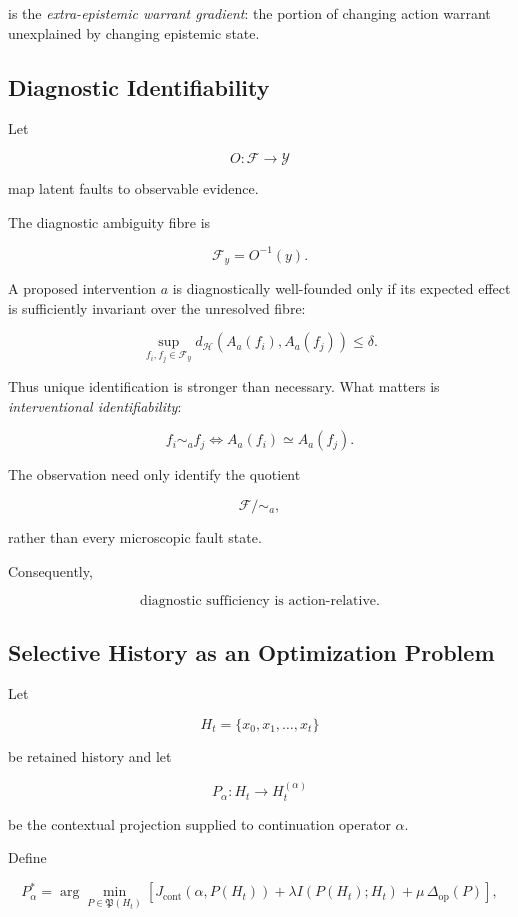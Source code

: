 \documentclass[11pt]{article}
\begin{document}
is the \emph{extra-epistemic warrant gradient}: the portion of changing action
warrant unexplained by changing epistemic state.

\subsection{Diagnostic Identifiability}

Let

\[
O:\mathcal F\rightarrow\mathcal Y
\]

map latent faults to observable evidence.

The diagnostic ambiguity fibre is

\[
\mathcal F_y
=
O^{-1}(y).
\]

A proposed intervention $a$ is diagnostically well-founded only if its
expected effect is sufficiently invariant over the unresolved fibre:

\[
\sup_{f_i,f_j\in\mathcal F_y}
d_{\mathcal H}
\left(
A_a(f_i),
A_a(f_j)
\right)
\leq\delta.
\]

Thus unique identification is stronger than necessary. What matters is
\emph{interventional identifiability}:

\[
f_i\sim_a f_j
\iff
A_a(f_i)\simeq A_a(f_j).
\]

The observation need only identify the quotient

\[
\mathcal F/{\sim_a},
\]

rather than every microscopic fault state.

Consequently,

\[
\boxed{
\text{diagnostic sufficiency is action-relative}.
}
\]

\subsection{Selective History as an Optimization Problem}

Let

\[
H_t=\{x_0,x_1,\ldots,x_t\}
\]

be retained history and let

\[
P_\alpha:H_t\rightarrow H_t^{(\alpha)}
\]

be the contextual projection supplied to continuation operator $\alpha$.

Define

\[
P_\alpha^{*}
=
\arg\min_{P\in\mathfrak P(H_t)}
\left[
J_{\mathrm{cont}}(\alpha,P(H_t))
+
\lambda I(P(H_t);H_t)
+
\mu\,\Delta_{\mathrm{op}}(P)
\right],
\]
\end{document}
